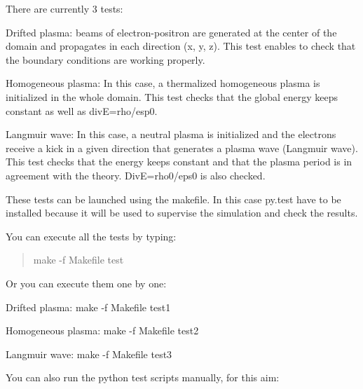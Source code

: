 There are currently 3 tests\+:


\begin{DoxyItemize}
\item Drifted plasma\+: beams of electron-\/positron are generated at the center of the domain and propagates in each direction (x, y, z). This test enables to check that the boundary conditions are working properly.
\item Homogeneous plasma\+: In this case, a thermalized homogeneous plasma is initialized in the whole domain. This test checks that the global energy keeps constant as well as divE=rho/esp0.
\item Langmuir wave\+: In this case, a neutral plasma is initialized and the electrons receive a kick in a given direction that generates a plasma wave (Langmuir wave). This test checks that the energy keeps constant and that the plasma period is in agreement with the theory. DivE=rho0/eps0 is also checked.
\end{DoxyItemize}

These tests can be launched using the makefile. In this case py.\+test have to be installed because it will be used to supervise the simulation and check the results.

You can execute all the tests by typing\+:

\begin{quote}
make -\/f Makefile test \end{quote}


Or you can execute them one by one\+:


\begin{DoxyItemize}
\item Drifted plasma\+: {\ttfamily make -\/f Makefile test1}
\item Homogeneous plasma\+: {\ttfamily make -\/f Makefile test2}
\item Langmuir wave\+: {\ttfamily make -\/f Makefile test3}
\end{DoxyItemize}

You can also run the python test scripts manually, for this aim\+:


